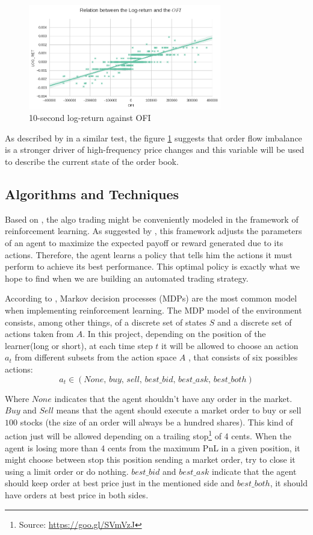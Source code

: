 \documentclass[a4paper]{article}
\begin{document}
\begin{figure}[ht!]
\centering
\includegraphics[width=0.75\textwidth]{figures/ofi_logret.png}
\caption{\label{fig:ofi_linear}10-second log-return against OFI}
\end{figure}

As described by \cite{cont2014price} in a similar test, the figure \ref{fig:ofi_linear} suggests that order flow imbalance is a stronger driver of high-frequency price changes and this variable will be used to describe the current state of the order book.

\subsection{Algorithms and Techniques}
Based on \cite{cont2014price}, the algo trading might be conveniently modeled in the framework of reinforcement learning. As suggested by \cite{du1algorithm}, this framework adjusts the parameters of an agent to maximize the expected payoff or reward generated due to its actions. Therefore, the agent learns a policy that tells him the actions it must perform to achieve its best performance. This optimal policy is exactly what we hope to find when we are building an automated trading strategy.

According to \cite{chan2001electronic}, Markov decision processes (MDPs) are the most common model when implementing reinforcement learning.  The MDP model of the environment consists, among other things, of a discrete set of states $S$ and a discrete set of actions taken from $A$. In this project, depending on the position of the learner(long or short), at each time step $t$ it will be allowed to choose an action $a_t$ from different subsets from the action space $A$ , that consists of six possibles actions:
$$a_t \in \left (None,\, buy,\, sell,\, best\_bid,\, best\_ask,\, best\_both \right)$$

Where $None$ indicates that the agent shouldn't have any order in the market. $Buy$ and $Sell$ means that the agent should execute a market order to buy or sell $100$ stocks (the size of an order will always be a hundred shares). This kind of action just will be allowed depending on a trailing stop\footnote{Source: \url{https://goo.gl/SVmVzJ}} of 4 cents. When the agent is losing more than 4 cents from the maximum PnL in a given position, it might choose between stop this position sending a market order, try to close it using a limit order or do nothing. $best\_bid$ and $best\_ask$ indicate that the agent should keep order at best price just in the mentioned side and $best\_both$, it should have orders at best price in both sides.
\end{document}
